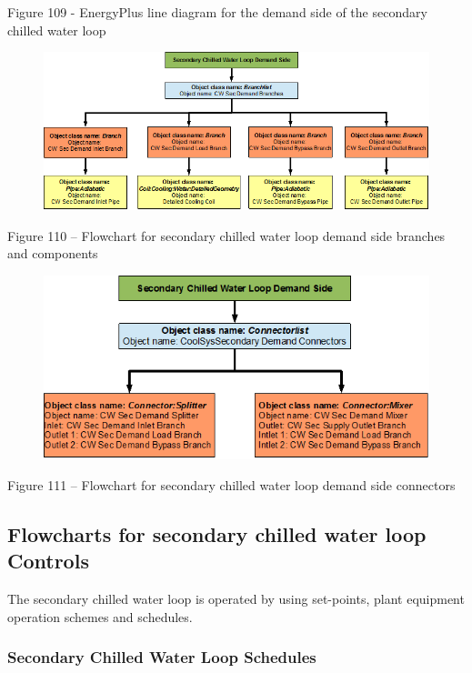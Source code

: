 Figure 109 - EnergyPlus line diagram for the demand side of the secondary chilled water loop

\begin{figure}[htbp]
\centering
\includegraphics{media/image110.png}
\caption{}
\end{figure}

Figure 110 -- Flowchart for secondary chilled water loop demand side branches and components

\begin{figure}[htbp]
\centering
\includegraphics{media/image111.png}
\caption{}
\end{figure}

Figure 111 -- Flowchart for secondary chilled water loop demand side connectors

\subsection{Flowcharts for secondary chilled water loop Controls}\label{flowcharts-for-secondary-chilled-water-loop-controls}

The secondary chilled water loop is operated by using set-points, plant equipment operation schemes and schedules.

\subsubsection{Secondary Chilled Water Loop Schedules}\label{secondary-chilled-water-loop-schedules}

